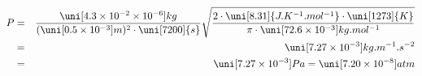 \begin{eqnarray*}
P &=&
\frac{
\uni[4.3 \times 10^{-2} \times 10^{-6}]{kg}
}{
(\uni[0.5 \times 10^{-3}]{m})^2
\cdot
\uni[7200]{s}
}
\sqrt{
\frac{
2
\cdot
\uni[8.31]{J.K^{-1}.mol^{-1}} 
\cdot 
\uni[1273]{K}
}{
\pi 
\cdot
\uni[72.6 \times 10^{-3}]{kg.mol^{-1}}
}
}
\\ &=&
\uni[7.27 \times 10^{-3}]{kg.m^{-1}.s^{-2}}
\\ &=&
\uni[7.27 \times 10^{-3}]{Pa}
= %
\uni[7.20 \times 10^{-8}]{atm}
\label{}
\end{eqnarray*}
